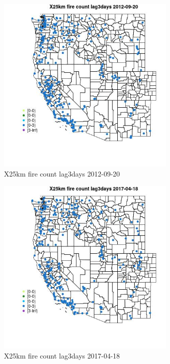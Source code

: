 \begin{figure} 
\centering  
\includegraphics[width=0.77\textwidth]{Code_Outputs/Report_ML_input_PM25_Step4_part_e_de_duplicated_aves_compiled_2019-05-14wNAs_MapObsX25km_fire_count_lag3days2012-09-20.jpg} 
\caption{\label{fig:Report_ML_input_PM25_Step4_part_e_de_duplicated_aves_compiled_2019-05-14wNAsMapObsX25km_fire_count_lag3days2012-09-20}X25km fire count lag3days 2012-09-20} 
\end{figure} 
 

\begin{figure} 
\centering  
\includegraphics[width=0.77\textwidth]{Code_Outputs/Report_ML_input_PM25_Step4_part_e_de_duplicated_aves_compiled_2019-05-14wNAs_MapObsX25km_fire_count_lag3days2017-04-18.jpg} 
\caption{\label{fig:Report_ML_input_PM25_Step4_part_e_de_duplicated_aves_compiled_2019-05-14wNAsMapObsX25km_fire_count_lag3days2017-04-18}X25km fire count lag3days 2017-04-18} 
\end{figure} 
 

